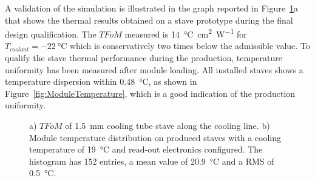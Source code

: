 A validation of the simulation is  illustrated in the  graph reported in Figure~\ref{fig:Temperature}a that shows the thermal results obtained on a stave prototype during the final design qualification. The $TFoM$ measured is  \SI{14}{\celsius \centi\meter^2\per\watt} for $T_{coolant} = \SI{-22}{\celsius}$ which is conservatively two times below the admissible value. To qualify the  stave thermal performance during the  production, temperature uniformity has been measured after module loading. All installed staves shows a temperature dispersion within \SI{0.48}{\celsius}, as shown in Figure~\ref{fig:ModuleTemperature}, which is a good indication of the production uniformity. \\

\begin{figure}
        \centering
  \caption{a) $TFoM$ of \SI{1.5}{\milli\meter} cooling tube stave along the cooling line. b) Module temperature distribution on produced staves with a cooling temperature of \SI{19}{\celsius} and read-out electronics configured. The histogram has 152 entries, a mean value of %
  \SI{20.9}{\celsius} and a RMS of \SI{0.5}{\celsius}.}
  \label{fig:Temperature}
\end{figure}

